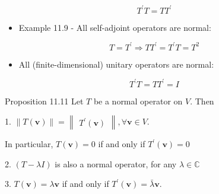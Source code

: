 \documentclass[11pt]{article}
\begin{document}
\[
{T}^{\prime }T = T{T}^{\prime }
\]

\begin{itemize}
\item Example 11.9 - All self-adjoint operators are normal:
\end{itemize}

\[
T = {T}^{\prime } \Rightarrow  T{T}^{\prime } = {T}^{\prime }T = {T}^2
\]

\begin{itemize}
\item All (finite-dimensional) unitary operators are normal:
\end{itemize}

\[
{T}^{\prime }T = T{T}^{\prime } = I
\]

Proposition 11.11 Let \(T\) be a normal operator on \(V\). Then

1. \(\parallel T\left( \mathbf{v}\right) \parallel  = \begin{Vmatrix}{{T}^{\prime }\left( \mathbf{v}\right) }\end{Vmatrix},\forall \mathbf{v} \in  V\).

In particular, \(T\left( \mathbf{v}\right)  = 0\) if and only if \({T}^{\prime }\left( \mathbf{v}\right)  = 0\)

2. \(\left( {T - {\lambda I}}\right)\) is also a normal operator, for any \(\lambda  \in  \mathbb{C}\)

3. \(T\left( \mathbf{v}\right)  = \lambda \mathbf{v}\) if and only if \({T}^{\prime }\left( \mathbf{v}\right)  = \bar{\lambda }\mathbf{v}\).
\end{document}
